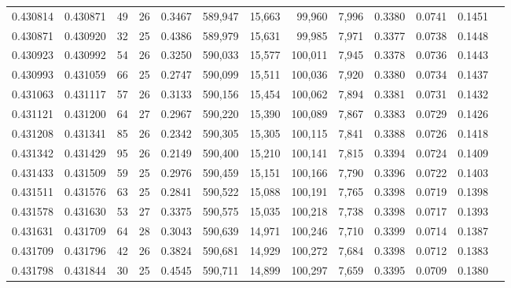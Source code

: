 \begin{tabular}{rrrrrrrrrrrrr}
0.430814 & 0.430871 &    49 &  26 &                                     0.3467 & 589,947 &  15,663 &  99,960 &   7,996 & 0.3380 & 0.0741 & 0.1451 \\
0.430871 & 0.430920 &    32 &  25 &                                     0.4386 & 589,979 &  15,631 &  99,985 &   7,971 & 0.3377 & 0.0738 & 0.1448 \\
0.430923 & 0.430992 &    54 &  26 &                                     0.3250 & 590,033 &  15,577 & 100,011 &   7,945 & 0.3378 & 0.0736 & 0.1443 \\
0.430993 & 0.431059 &    66 &  25 &                                     0.2747 & 590,099 &  15,511 & 100,036 &   7,920 & 0.3380 & 0.0734 & 0.1437 \\
0.431063 & 0.431117 &    57 &  26 &                                     0.3133 & 590,156 &  15,454 & 100,062 &   7,894 & 0.3381 & 0.0731 & 0.1432 \\
0.431121 & 0.431200 &    64 &  27 &                                     0.2967 & 590,220 &  15,390 & 100,089 &   7,867 & 0.3383 & 0.0729 & 0.1426 \\
0.431208 & 0.431341 &    85 &  26 &                                     0.2342 & 590,305 &  15,305 & 100,115 &   7,841 & 0.3388 & 0.0726 & 0.1418 \\
0.431342 & 0.431429 &    95 &  26 &                                     0.2149 & 590,400 &  15,210 & 100,141 &   7,815 & 0.3394 & 0.0724 & 0.1409 \\
0.431433 & 0.431509 &    59 &  25 &                                     0.2976 & 590,459 &  15,151 & 100,166 &   7,790 & 0.3396 & 0.0722 & 0.1403 \\
0.431511 & 0.431576 &    63 &  25 &                                     0.2841 & 590,522 &  15,088 & 100,191 &   7,765 & 0.3398 & 0.0719 & 0.1398 \\
0.431578 & 0.431630 &    53 &  27 &                                     0.3375 & 590,575 &  15,035 & 100,218 &   7,738 & 0.3398 & 0.0717 & 0.1393 \\
0.431631 & 0.431709 &    64 &  28 &                                     0.3043 & 590,639 &  14,971 & 100,246 &   7,710 & 0.3399 & 0.0714 & 0.1387 \\
0.431709 & 0.431796 &    42 &  26 &                                     0.3824 & 590,681 &  14,929 & 100,272 &   7,684 & 0.3398 & 0.0712 & 0.1383 \\
0.431798 & 0.431844 &    30 &  25 &                                     0.4545 & 590,711 &  14,899 & 100,297 &   7,659 & 0.3395 & 0.0709 & 0.1380 \\

\end{tabular}
